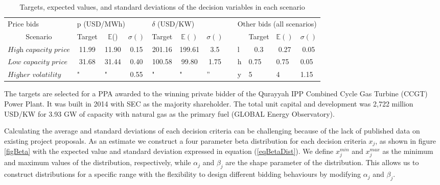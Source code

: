 \documentclass[informs]{informs3}
\begin{document}
\begin{table}[tableScenarios]
\caption {Targets, expected values, and standard deviations of the decision variables in each scenario } \label{tableScenarios}
\begin{tabular}{@{}lcccccclllll@{}}
\cmidrule(r){1-7} \cmidrule(l){9-12}
Price bids                     & \multicolumn{3}{l}{p (USD/MWh)}                            & \multicolumn{3}{l}{$\delta$ (USD/KW)}                                  &  & \multicolumn{4}{l}{Other bids (all scenarios)}                                                       \\ \cmidrule(r){1-7} \cmidrule(l){9-12} 
\multicolumn{1}{c}{Scenario}   & Target                & $\mathbb{E}$()        & $\sigma()$ & Target                & $\mathbb{E}()$        & $\sigma()$             &  &   & \multicolumn{1}{c}{Target} & \multicolumn{1}{c}{$\mathbb{E}()$} & \multicolumn{1}{c}{$\sigma()$} \\
$\textit{High capacity price}$ & 11.99                 & 11.90                 & 0.15       & 201.16                & 199.61                & 3.5                  &  & l & \multicolumn{1}{c}{0.3}    & \multicolumn{1}{c}{0.27}           & \multicolumn{1}{c}{0.05}       \\
$\textit{Low capacity price}$  & 31.68                & 31.44                & 0.40       & 100.58               & 99.80                & 1.75                &  & h & 0.75                       & 0.75                               & 0.05                           \\
$\textit{Higher volatility}$  & \multicolumn{1}{l}{"} & \multicolumn{1}{l}{"} & 0.55       & \multicolumn{1}{l}{"} & \multicolumn{1}{l}{"} & \multicolumn{1}{l}{''} &  & y & 5                          & 4                                  & 1.15                           \\ \cmidrule(r){1-7} \cmidrule(l){9-12} 
\end{tabular}
\end{table}

The targets are selected for a PPA awarded to the winning private bidder of the Qurayyah IPP Combined Cycle Gas Turbine (CCGT) Power Plant. It was built in 2014 with SEC as the majority shareholder. The total unit capital and development was 2,722 million USD/KW for 3.93 GW of capacity with natural gas as the primary fuel (GLOBAL Energy Observatory).

Calculating the average and standard deviations of each decision criteria can be challenging because of the lack of published data on existing project proposals. As an estimate  we construct a four parameter beta distribution for each decision criteria $x_j$, as shown in figure \ref{figBeta}  with the expected value and standard deviation expressed in equation (\ref{eqBetaDist}). We define $x_j^{min}$ and $x_j^{max}$ as the minimum and maximum values of the distribution, respectively, while $\alpha_j$ and $\beta_j$ are the shape parameter of the distribution. This allows us to construct distributions for  a specific range with the flexibility to design different bidding behaviours by modifying $\alpha_j$ and $\beta_j$.
\end{document}
